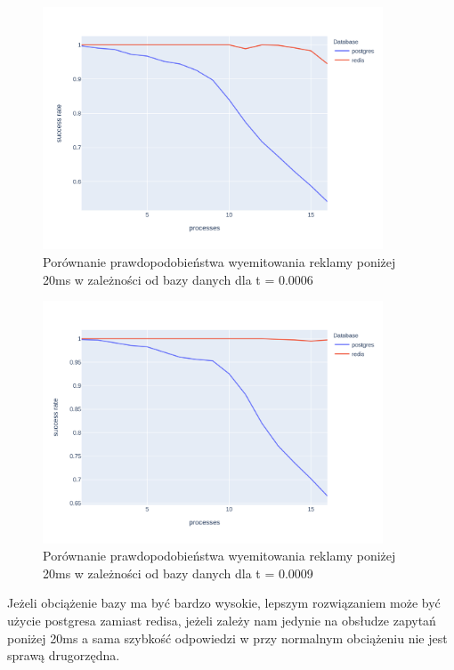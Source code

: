 \documentclass[10pt]{article}
\begin{document}
\begin{figure}[H]
    \centering
    \includegraphics[width=0.9\textwidth]{./graphs/success_rate_postgres_vs_redis_0006.png}
    \caption{Porównanie prawdopodobieństwa wyemitowania reklamy poniżej 20ms w zależności od bazy danych dla t = 0.0006}
\end{figure}

\begin{figure}[H]
    \centering
    \includegraphics[width=0.9\textwidth]{./graphs/success_rate_postgres_vs_redis_0009.png}
    \caption{Porównanie prawdopodobieństwa wyemitowania reklamy poniżej 20ms w zależności od bazy danych dla t = 0.0009}
\end{figure}

Jeżeli obciążenie bazy ma być bardzo wysokie, lepszym rozwiązaniem może być użycie postgresa zamiast redisa, jeżeli zależy nam jedynie na obsłudze zapytań poniżej 20ms a sama szybkość odpowiedzi w przy normalnym obciążeniu nie jest sprawą drugorzędna.
\end{document}
